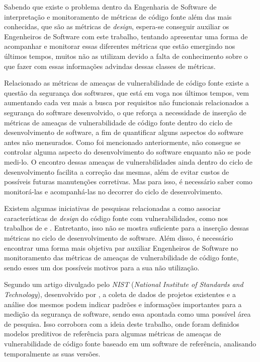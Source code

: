 Sabendo que existe o problema dentro da Engenharia de Software de interpretação
e monitoramento de métricas de código fonte além das mais conhecidas, que são 
as métricas de \textit{design}, espera-se conseguir auxiliar os 
Engenheiros de Software com este trabalho, tentando apresentar uma forma de
acompanhar e monitorar essas diferentes métricas que estão emergindo
nos últimos tempos, muitos não as utilizam devido a falta de conhecimento sobre
o que fazer com essas informações advindas dessas classes de métricas.

Relacionado as métricas de ameaças de vulnerabilidade de código fonte existe a
questão da segurança dos softwares, que está em voga nos últimos tempos,
vem aumentando cada vez mais a busca por requisitos não funcionais relacionados a
segurança do software desenvolvido, o que reforça a necessidade de inserção de
métricas de ameaças de vulnerabilidade de código fonte dentro do ciclo de
desenvolvimento de software, a fim de quantificar alguns aspectos do software
antes não mensurados. Como foi mencionado anteriormente, não consegue se
controlar alguma aspecto do desenvolvimento do software enquanto não se pode
medi-lo. O encontro dessas ameaças de vulnerabilidades ainda dentro do ciclo de
desenvolvimento facilita a correção das mesmas, além de evitar custos de
possíveis futuras manutenções corretivas. Mas para isso, é necessário saber como
monitorá-las e acompanhá-las no decorrer do ciclo de desenvolvimento.

Existem algumas iniciativas de pesquisas relacionadas a como associar
características de \textit{design} do código fonte com vulnerabilidades, como
nos trabalhos de  e
. Entretanto, isso não se mostra suficiente para a
inserção dessas métricas no ciclo de desenvolvimento de software. Além disso, é
necessário encontrar uma forma mais objetiva par auxiliar Engenheiros de
Software no monitoramento das métricas de ameaças de vulnerabilidade de código
fonte, sendo esses um dos possíveis motivos para a sua não utilização.

Segundo um artigo divulgado pelo \textit{NIST} (\textit{National Institute of
Standards and Technology}), desenvolvido por , a coleta
de dados de projetos existentes e a análise dos mesmos podem indicar padrões e
informações importantes para a medição da segurança de software, sendo essa
apontada como uma possível área de pesquisa. Isso corrobora com a ideia deste
trabalho, onde foram definidos modelos preditivos de referência para algumas
métricas de ameaças de vulnerabilidade de código fonte baseado em um software de
referência, analisando temporalmente as suas versões.


